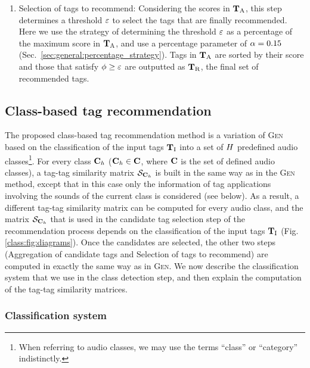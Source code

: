 \begin{enumerate}
\item Selection of tags to recommend: Considering the scores in $\mathbf{T}_{\text{A}}$, this step determines a threshold $\varepsilon$ to select the tags that are finally recommended. Here we use the strategy of determining the threshold $\varepsilon$ as a percentage of the maximum score in $\mathbf{T}_{\text{A}}$, and use a percentage parameter of $\alpha=0.15$ (Sec.~\ref{sec:general:percentage_strategy}). Tags in $\mathbf{T}_{\text{A}}$ are sorted by their score and those that satisfy $\phi \geq \varepsilon$ are outputted as $\mathbf{T}_{\text{R}}$, the final set of recommended tags.
\end{enumerate}

\subsection{Class-based tag recommendation}
\label{class:sec:class_based_tag_rec_ref}

The proposed class-based tag recommendation method is a variation of \textsc{Gen} based on the classification of the input tags $\mathbf{T}_{\text{I}}$ into a set of $H$ predefined audio classes\footnote{When referring to audio classes, we may use the terms ``class'' or ``category'' indistinctly.}. For every class $\mathbf{C}_{h}$ ($\mathbf{C}_{h} \in \mathbf{C}$, where $\mathbf{C}$ is the set of defined audio classes), a tag-tag similarity matrix $\mathcal{S}_{\mathbf{C}_{h}}$ is built in the same way as in the \textsc{Gen} method, except that in this case only the information of tag applications involving the sounds of the current class is considered (see below). As a result, a different tag-tag similarity matrix can be computed for every audio class, and the matrix $\mathcal{S}_{\mathbf{C}_{h}}$ that is used in the candidate tag selection step of the recommendation process depends on the classification of the input tags $\mathbf{T}_{\text{I}}$ (Fig. \ref{class:fig:diagrams}).
Once the candidates are selected, the other two steps (Aggregation of candidate tags and Selection of tags to recommend) are computed in exactly the same way as in \textsc{Gen}.
We now describe the classification system that we use in the class detection step, and then explain the computation of the tag-tag similarity matrices.


\subsubsection{Classification system}
\label{class:sec:classification_system}

